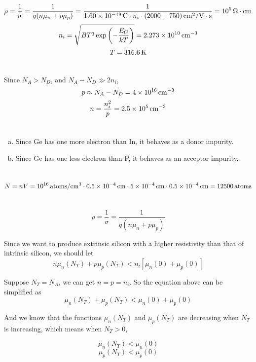 \documentclass{article}
\newcommand{\Omegacm}{{\rm\,\Omega\cdot cm}}
\newcommand{\unit}[1]{{\rm\,#1}}
\begin{document}
\section{}
$$\rho=\frac{1}{\sigma}=\frac{1}{q(n\mu_n+p\mu_p)}=\frac{1}{1.60\times10^{-19}\unit{C}\cdot n_i\cdot(2000+750)\unit{cm^2/V\cdot s}}=10^5\Omegacm$$
$$n_i=\sqrt{BT^3\exp\left(-\frac{E_G}{kT}\right)}=2.273\times10^{10}\unit{cm^{-3}}$$
$$T=316.6\unit{K}$$

\section{}
Since $N_A>N_D$, and $N_A-N_D\gg 2n_i$,
$$p\approx N_A-N_D=4\times10^{16}\unit{cm^{-3}}$$
$$n=\frac{n_i^2}{p}=2.5\times10^{5}\unit{cm^{-3}}$$

\section{}
\begin{enumerate}[(a)]
\item Since Ge has one more electron than In, it behaves as a donor impurity.
\item Since Ge has one less electron than P, it behaves as an acceptor impurity.
\end{enumerate}

\section{}
$$N=nV=10^{16}\unit{atoms/cm^{3}}\cdot0.5\times10^{-4}\unit{cm}\cdot5\times10^{-4}\unit{cm}\cdot0.5\times10^{-4}\unit{cm}=12500\unit{atoms}$$

\section{}
$$\rho=\frac{1}{\sigma}=\frac{1}{q(n\mu_n+p\mu_p)}$$

Since we want to produce extrinsic silicon with a higher resistivity than that of intrinsic silicon, we should let
$$n\mu_n(N_T)+p\mu_p(N_T)<n_i[\mu_n(0)+\mu_p(0)]$$

Suppose $N_T=N_A$, we can get $n=p=n_i$. So the equation above can be simplified as
$$\mu_n(N_T)+\mu_p(N_T)<\mu_n(0)+\mu_p(0)$$

And we know that the functions $\mu_n(N_T)$ and $\mu_p(N_T)$ are decreasing when $N_T$ is increasing, which means when $N_T>0$,

$$\mu_n(N_T)<\mu_n(0)$$
$$\mu_p(N_T)<\mu_p(0)$$
\end{document}
